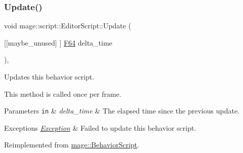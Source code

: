 \subsubsection{\texorpdfstring{Update()}{Update()}}
{\footnotesize\ttfamily void mage\+::script\+::\+Editor\+Script\+::\+Update (\begin{DoxyParamCaption}\item[{\mbox{[}\mbox{[}maybe\+\_\+unused\mbox{]} \mbox{]} \hyperlink{namespacemage_ad26233bbec640deda836e572c1a23708}{F64}}]{delta\+\_\+time }\end{DoxyParamCaption})\hspace{0.3cm}{\ttfamily [override]}, {\ttfamily [virtual]}}

Updates this behavior script.

This method is called once per frame.


\begin{DoxyParams}[1]{Parameters}
\mbox{\tt in}  & {\em delta\+\_\+time} & The elapsed time since the previous update. \\
\hline
\end{DoxyParams}

\begin{DoxyExceptions}{Exceptions}
{\em \hyperlink{classmage_1_1_exception}{Exception}} & Failed to update this behavior script. \\
\hline
\end{DoxyExceptions}


Reimplemented from \hyperlink{classmage_1_1_behavior_script_afb9cf3759edf8876416d1df85489cba6}{mage\+::\+Behavior\+Script}.

